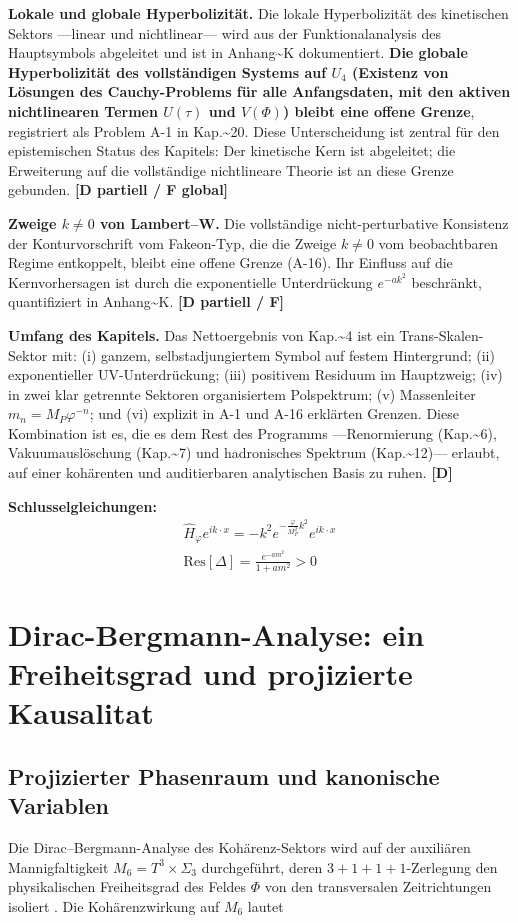 ﻿\documentclass[11pt,letterpaper]{article}
\begin{document}
\textbf{Lokale und globale Hyperbolizität.} Die lokale Hyperbolizität des kinetischen Sektors ---linear und nichtlinear--- wird aus der Funktionalanalysis des Hauptsymbols abgeleitet und ist in Anhang\textasciitilde{}K dokumentiert. \textbf{Die globale Hyperbolizität des vollständigen Systems auf $U_4$ (Existenz von Lösungen des Cauchy-Problems für alle Anfangsdaten, mit den aktiven nichtlinearen Termen $U(\tau)$ und $V(\Phi)$) bleibt eine offene Grenze}, registriert als Problem A-1 in Kap.\textasciitilde{}20. Diese Unterscheidung ist zentral für den epistemischen Status des Kapitels: Der kinetische Kern ist abgeleitet; die Erweiterung auf die vollständige nichtlineare Theorie ist an diese Grenze gebunden. \textbf{[D partiell / F global]}

\textbf{Zweige $k \neq 0$ von Lambert--W.} Die vollständige nicht-perturbative Konsistenz der Konturvorschrift vom Fakeon-Typ, die die Zweige $k \neq 0$ vom beobachtbaren Regime entkoppelt, bleibt eine offene Grenze (A-16). Ihr Einfluss auf die Kernvorhersagen ist durch die exponentielle Unterdrückung $e^{-ak^2}$ beschränkt, quantifiziert in Anhang\textasciitilde{}K. \textbf{[D partiell / F]}

\textbf{Umfang des Kapitels.} Das Nettoergebnis von Kap.\textasciitilde{}4 ist ein Trans-Skalen-Sektor mit: (i) ganzem, selbstadjungiertem Symbol auf festem Hintergrund; (ii) exponentieller UV-Unterdrückung; (iii) positivem Residuum im Hauptzweig; (iv) in zwei klar getrennte Sektoren organisiertem Polspektrum; (v) Massenleiter $m_n = M_P\varphi^{-n}$; und (vi) explizit in A-1 und A-16 erklärten Grenzen. Diese Kombination ist es, die es dem Rest des Programms ---Renormierung (Kap.\textasciitilde{}6), Vakuumauslöschung (Kap.\textasciitilde{}7) und hadronisches Spektrum (Kap.\textasciitilde{}12)--- erlaubt, auf einer kohärenten und auditierbaren analytischen Basis zu ruhen. \textbf{[D]}

\textbf{Schlusselgleichungen:}
\begin{align*}
    \hat{H}_\varphi e^{ik\cdot x} = -k^2 e^{-\frac{\varphi}{M_P^2}k^2}e^{ik\cdot x} \\
    \mathrm{Res}[\Delta] = \frac{e^{-am^2}}{1+am^2} > 0
\end{align*}
\section{Dirac-Bergmann-Analyse: ein Freiheitsgrad und projizierte Kausalitat}
\subsection{Projizierter Phasenraum und kanonische Variablen}
Die Dirac--Bergmann-Analyse des Kohärenz-Sektors wird auf der auxiliären Mannigfaltigkeit $M_6 = T^3 \times \Sigma_3$ durchgeführt, deren $3+1+1+1$-Zerlegung den physikalischen Freiheitsgrad des Feldes $\Phi$ von den transversalen Zeitrichtungen isoliert \cite{Dirac1950,Bergmann1949}. Die Kohärenzwirkung auf $M_6$ lautet
\end{document}
